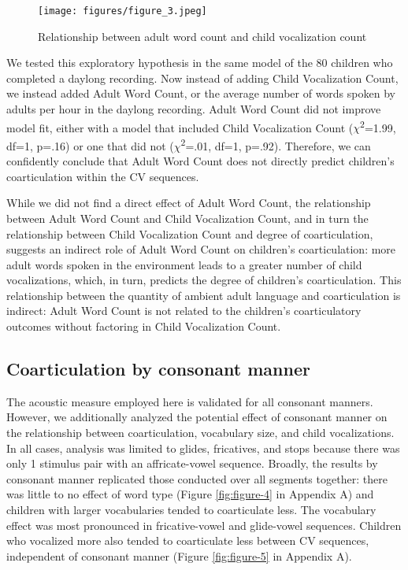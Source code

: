 \documentclass[a4paper,man,natbib,donotrepeattitle, apacite]{apa6}
\begin{document}
\begin{figure}[H]
\centering
\texttt{[image: figures/figure\_3.jpeg]}
\caption{\label{fig:figure-3}Relationship between adult word count and child vocalization count}
\end{figure}

We tested this exploratory hypothesis in the same model of the 80 children who completed a daylong recording. Now instead of adding Child Vocalization Count, we instead added Adult Word Count, or the average number of words spoken by adults per hour in the daylong recording. Adult Word Count did not improve model fit, either with a model that included Child Vocalization Count ($\chi$\textsuperscript{2}=1.99, df=1, p=.16) or one that did not ($\chi$\textsuperscript{2}=.01, df=1, p=.92). Therefore, we can confidently conclude that Adult Word Count does not directly predict children’s coarticulation within the CV sequences.

While we did not find a direct effect of Adult Word Count, the relationship between Adult Word Count and Child Vocalization Count, and in turn the relationship between Child Vocalization Count and degree of coarticulation, suggests an indirect role of Adult Word Count on children’s coarticulation: more adult words spoken in the environment leads to a greater number of child vocalizations, which, in turn, predicts the degree of children’s coarticulation. This relationship between the quantity of ambient adult language and coarticulation is indirect: Adult Word Count is not related to the children’s coarticulatory outcomes without factoring in Child Vocalization Count.  

\subsection{Coarticulation by consonant manner}

The acoustic measure employed here is validated for all consonant manners. However, we additionally analyzed the potential effect of consonant manner on the relationship between coarticulation, vocabulary size, and child vocalizations. In all cases, analysis was limited to glides, fricatives, and stops because there was only 1 stimulus pair with an affricate-vowel sequence. Broadly, the results by consonant manner replicated those conducted over all segments together: there was little to no effect of word type (Figure \ref{fig:figure-4} in Appendix A) and children with larger vocabularies tended to coarticulate less. The vocabulary effect was most pronounced in fricative-vowel and glide-vowel sequences. Children who vocalized more also tended to coarticulate less between CV sequences, independent of consonant manner (Figure \ref{fig:figure-5} in Appendix A). 
\end{document}

